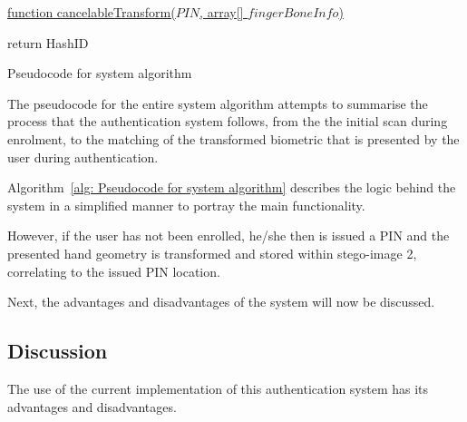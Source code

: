 
\begin{algorithm}
     
     \underline{function cancelableTransform($PIN$, array[] $fingerBoneInfo$)}\;
     
        
      return HashID\;
     \caption{Pseudocode for system algorithm}
     \label{alg: Pseudocode for system algorithm}
     
\end{algorithm}



The pseudocode for the entire system algorithm attempts to summarise the process that the authentication system follows, from the the initial scan during enrolment, to the matching of the transformed biometric that is presented by the user during authentication. 

Algorithm~\ref{alg: Pseudocode for system algorithm} describes the logic behind the system in a simplified manner to portray the main functionality. 



However, if the user has not been enrolled, he/she then is issued a PIN and the presented hand geometry is transformed and stored within stego-image 2, correlating to the issued PIN location.

Next, the advantages and disadvantages of the system will now be discussed.

\subsection{Discussion}

The use of the current implementation of this authentication system has its advantages and disadvantages.


